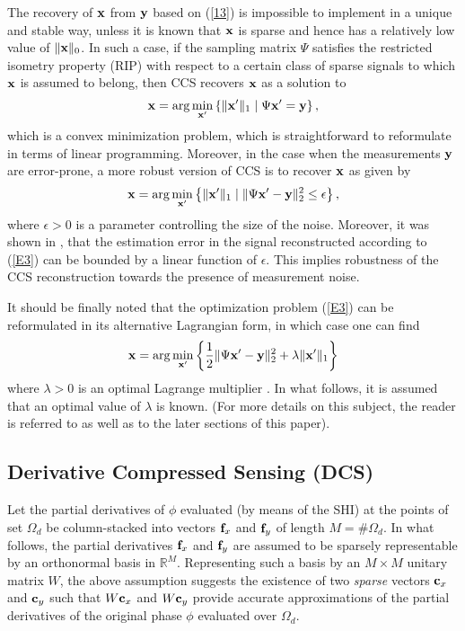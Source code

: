 \pdfoutput=1 \documentclass[journal]{IEEEtran}
\newcommand{\xx}{{\bf x}}
\newcommand{\yy}{{\bf y}}
\newcommand{\ffx}{{\bf f}_x}
\newcommand{\ffy}{{\bf f}_y}
\newcommand{\ccx}{{\bf c}_x}
\newcommand{\ccy}{{\bf c}_y}
\begin{document}
The recovery of $\xx$ from $\yy$ based on (\ref{13}) is impossible to implement in a unique and stable way, unless it is known that $\xx$ is sparse and hence has a relatively low value of $\|\xx\|_0$. In such a case, if the sampling matrix $\Psi$ satisfies the restricted isometry property (RIP) \cite{4, 13} with respect to a certain class of sparse signals to which $\xx$ is assumed to belong, then CCS recovers $\xx$ as a solution to \cite{20, 21}
\begin{equation}
\xx = \arg \min_{\xx^\prime} \left\{ \| \xx^\prime \|_1 \mid \Psi \xx^\prime = \yy \right\},
\end{equation}
which is a convex minimization problem, which is straightforward to reformulate in terms of linear programming. Moreover, in the case when the measurements $\yy$ are error-prone, a more robust version of CCS is to recover $\xx$ as given by
\begin{equation}\label{E3}
\xx = \arg \min_{\xx^\prime} \left\{ \| \xx^\prime \|_1 \mid \| \Psi \xx^\prime - \yy \|_2^2 \le \epsilon \right\},
\end{equation}
where $\epsilon > 0$ is a parameter controlling the size of the noise. Moreover, it was shown in \cite{4, 13}, that the estimation error in the signal reconstructed according to (\ref{E3}) can be bounded by a linear function of $\epsilon$. This implies robustness of the CCS reconstruction towards the presence of measurement noise.

It should be finally noted that the optimization problem (\ref{E3}) can be reformulated in its alternative Lagrangian form, in which case one can find
\begin{equation} \label{17}
\xx = \arg \min_{\xx^\prime} \left\{ \frac{1}{2} \| \Psi \xx^\prime - \yy \|_2^2 + \lambda \| \xx^\prime \|_1 \right\}
\end{equation}
where $\lambda > 0 $ is an optimal Lagrange multiplier \cite{20}. In what follows, it is assumed that an optimal value of $\lambda$ is known. (For more details on this subject, the reader is referred to \cite{20} as well as to the later sections of this paper).

\subsection{Derivative Compressed Sensing (DCS)}
Let the partial derivatives of $\phi$ evaluated (by means of the SHI) at the points of set $\Omega_d$ be column-stacked into vectors $\ffx$ and $\ffy$ of length $M = \#\Omega_d$.  In what follows, the partial derivatives $\ffx$ and $\ffy$ are assumed to be sparsely representable by an orthonormal basis in $\mathbb{R}^M$. Representing such a basis by an $M \times M$ unitary matrix $W$, the above assumption suggests the existence of two {\em sparse} vectors $\ccx$ and $\ccy$ such that $W \ccx$ and $W \ccy$ provide accurate approximations of the partial derivatives of the original phase $\phi$ evaluated over $\Omega_d$.
\end{document}
